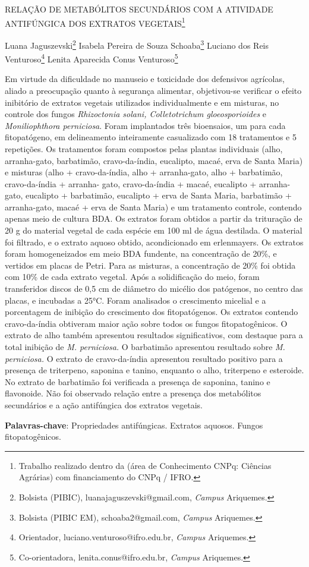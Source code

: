 \documentclass[article,12pt,onesidea,4paper,english,brazil]{abntex2}
\begin{document}
	
	
	\frenchspacing 
	
	\begin{center}
		\LARGE RELAÇÃO DE METABÓLITOS SECUNDÁRIOS COM A ATIVIDADE
		ANTIFÚNGICA DOS EXTRATOS VEGETAIS\footnote{Trabalho realizado dentro da (área de Conhecimento CNPq: Ciências Agrárias) com financiamento do CNPq / IFRO.}
		
		\normalsize
		Luana Jaguszevski\footnote{Bolsista (PIBIC), luanajaguszevski@gmail.com, \textit{Campus} Ariquemes.} 
		Isabela Pereira de Souza Schoaba\footnote{Bolsista (PIBIC EM), schoaba2@gmail.com, \textit{Campus} Ariquemes.} 
		Luciano dos Reis Venturoso\footnote{Orientador, luciano.venturoso@ifro.edu.br, \textit{Campus} Ariquemes.} 
		Lenita Aparecida Conus Venturoso\footnote{Co-orientadora, lenita.conus@ifro.edu.br, \textit{Campus} Ariquemes.} 
	\end{center}
	
	\noindent Em virtude da dificuldade no manuseio e toxicidade dos defensivos agrícolas, aliado
	a preocupação quanto à segurança alimentar, objetivou-se verificar o efeito inibitório
	de extratos vegetais utilizados individualmente e em misturas, no controle dos
	fungos \textit{Rhizoctonia solani, Colletotrichum gloeosporioides} e \textit{Moniliophthora perniciosa}. Foram implantados três bioensaios, um para cada fitopatógeno, em
	delineamento inteiramente casualizado com 18 tratamentos e 5 repetições. Os
	tratamentos foram compostos pelas plantas individuais (alho, arranha-gato,
	barbatimão, cravo-da-índia, eucalipto, macaé, erva de Santa Maria) e misturas (alho
	+ cravo-da-índia, alho + arranha-gato, alho + barbatimão, cravo-da-índia + arranha-
	gato, cravo-da-índia + macaé, eucalipto + arranha-gato, eucalipto + barbatimão,
	eucalipto + erva de Santa Maria, barbatimão + arranha-gato, macaé + erva de Santa
	Maria) e um tratamento controle, contendo apenas meio de cultura BDA. Os extratos
	foram obtidos a partir da trituração de 20 g do material vegetal de cada espécie em
	100 ml de água destilada. O material foi filtrado, e o extrato aquoso obtido,
	acondicionado em erlenmayers. Os extratos foram homogeneizados em meio BDA
	fundente, na concentração de 20\%, e vertidos em placas de Petri. Para as misturas,
	a concentração de 20\% foi obtida com 10\% de cada extrato vegetal. Após a
	solidificação do meio, foram transferidos discos de 0,5 cm de diâmetro do micélio
	dos patógenos, no centro das placas, e incubadas a 25°C. Foram analisados o
	crescimento micelial e a porcentagem de inibição do crescimento dos fitopatógenos.
	Os extratos contendo cravo-da-índia obtiveram maior ação sobre todos os fungos
	fitopatogênicos. O extrato de alho também apresentou resultados significativos, com
	destaque para a total inibição de \textit{M. perniciosa.} O barbatimão apresentou resultado
	sobre \textit{M. perniciosa. }O extrato de cravo-da-índia apresentou resultado positivo para
	a presença de triterpeno, saponina e tanino, enquanto o alho, triterpeno e esteroide.
	No extrato de barbatimão foi verificada a presença de saponina, tanino e flavonoide.
	Não foi observado relação entre a presença dos metabólitos secundários e a ação
	antifúngica dos extratos vegetais.
	
	\vspace{\onelineskip}
	
	\noindent
	\textbf{Palavras-chave}: Propriedades antifúngicas. Extratos aquosos. Fungos
	fitopatogênicos.	
	
\end{document}
